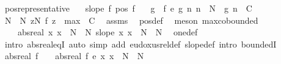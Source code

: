 \begin{isabellebody}
\isamarkupfalse%
\ pos{\isacharunderscore}{\kern0pt}representative{\isacharcolon}{\kern0pt}\isanewline
\ \ \ {\isachardoublequoteopen}slope\ f{\isachardoublequoteclose}\ {\isachardoublequoteopen}pos\ f{\isachardoublequoteclose}\isanewline
\ \ \ g\ \ {\isachardoublequoteopen}f\ {\isasymsim}\isactrlsub e\ g{\isachardoublequoteclose}\ {\isachardoublequoteopen}{\isasymAnd}n{\isachardot}{\kern0pt}\ n\ {\isasymge}\ N\ {\isasymLongrightarrow}\ g\ n\ {\isasymge}\ C{\isachardoublequoteclose}\isanewline
%
\isadelimproof
%
\endisadelimproof
%
\isatagproof
{}\isamarkupfalse%
\ {\isacharminus}{\kern0pt}\isanewline
\ \ \isamarkupfalse%
\ N{\isacharprime}{\kern0pt}\ \ N{\isacharprime}{\kern0pt}{\isacharcolon}{\kern0pt}\ {\isachardoublequoteopen}{\isasymforall}z{\isasymge}N{\isacharprime}{\kern0pt}{\isachardot}{\kern0pt}\ f\ z\ {\isasymge}\ max\ {}\ C{\isachardoublequoteclose}\ \isamarkupfalse%
\ assms\ \isamarkupfalse%
\ pos{\isacharunderscore}{\kern0pt}def\ \isamarkupfalse%
\ {\isacharparenleft}{\kern0pt}meson\ max{\isachardot}{\kern0pt}cobounded{}{\isacharparenright}{\kern0pt}\isanewline
\ \ \isamarkupfalse%
\ {\isacharasterisk}{\kern0pt}{\isacharcolon}{\kern0pt}\ {\isachardoublequoteopen}{}\ {\isacharequal}{\kern0pt}\ abs{\isacharunderscore}{\kern0pt}real\ {\isacharparenleft}{\kern0pt}{\isasymlambda}x{\isachardot}{\kern0pt}\ x\ {\isacharplus}{\kern0pt}\ N{\isacharprime}{\kern0pt}\ {\isacharminus}{\kern0pt}\ N{\isacharparenright}{\kern0pt}{\isachardoublequoteclose}\ {\isachardoublequoteopen}slope\ {\isacharparenleft}{\kern0pt}{\isasymlambda}x{\isachardot}{\kern0pt}\ x\ {\isacharplus}{\kern0pt}\ N{\isacharprime}{\kern0pt}\ {\isacharminus}{\kern0pt}\ N{\isacharparenright}{\kern0pt}{\isachardoublequoteclose}\ \isamarkupfalse%
\ one{\isacharunderscore}{\kern0pt}def\ \isamarkupfalse%
\ {\isacharparenleft}{\kern0pt}intro\ abs{\isacharunderscore}{\kern0pt}real{\isacharunderscore}{\kern0pt}eqI{\isacharparenright}{\kern0pt}\ {\isacharparenleft}{\kern0pt}auto\ simp\ add{\isacharcolon}{\kern0pt}\ eudoxus{\isacharunderscore}{\kern0pt}rel{\isacharunderscore}{\kern0pt}def\ slope{\isacharunderscore}{\kern0pt}def\ intro{\isacharbang}{\kern0pt}{\isacharcolon}{\kern0pt}\ boundedI{\isacharparenright}{\kern0pt}\isanewline
\ \ \isamarkupfalse%
\ {\isachardoublequoteopen}abs{\isacharunderscore}{\kern0pt}real\ f\ {\isacharasterisk}{\kern0pt}\ {}\ {\isacharequal}{\kern0pt}\ abs{\isacharunderscore}{\kern0pt}real\ {\isacharparenleft}{\kern0pt}f\ {\isacharasterisk}{\kern0pt}\isactrlsub e\ {\isacharparenleft}{\kern0pt}{\isasymlambda}x{\isachardot}{\kern0pt}\ x\ {\isacharplus}{\kern0pt}\ N{\isacharprime}{\kern0pt}\ {\isacharminus}{\kern0pt}\ N{\isacharparenright}{\kern0pt}{\isacharparenright}{\kern0pt}{\isachardoublequoteclose}\ \isamarkupfalse%

\end{isabellebody}
